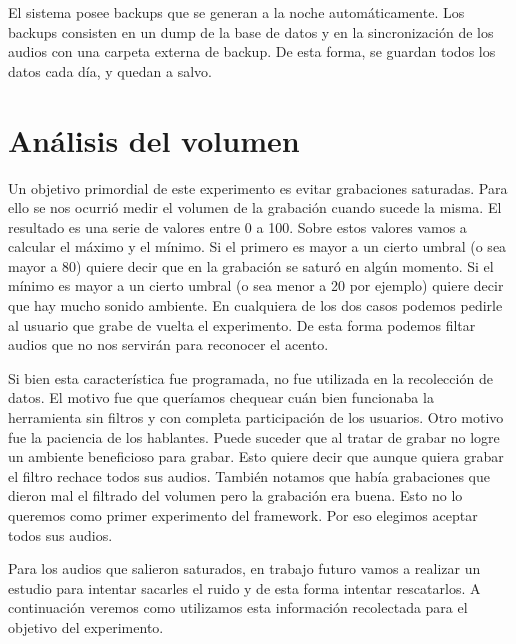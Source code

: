 El sistema posee backups que se generan a la noche automáticamente. Los backups consisten en un dump de la base de datos y en la sincronización de los audios con una carpeta externa de backup. De esta forma, se guardan todos los datos cada día, y quedan a salvo.

\section{Análisis del volumen}

Un objetivo primordial de este experimento es evitar grabaciones saturadas. Para ello se nos ocurrió medir el volumen de la grabación cuando sucede la misma. El resultado es una serie de valores entre 0 a 100. Sobre estos valores vamos a calcular el máximo y el mínimo. Si el primero es mayor a un cierto umbral (o sea mayor a 80) quiere decir que en la grabación se saturó en algún momento. Si el mínimo es mayor a un cierto umbral (o sea menor a 20 por ejemplo) quiere decir que hay mucho sonido ambiente. En cualquiera de los dos casos podemos pedirle al usuario que grabe de vuelta el experimento. De esta forma podemos filtar audios que no nos servirán para reconocer el acento.

Si bien esta característica fue programada, no fue utilizada en la recolección de datos. El motivo fue que queríamos chequear cuán bien funcionaba la herramienta sin filtros y con completa participación de los usuarios. Otro motivo fue la paciencia de los hablantes. Puede suceder que al tratar de grabar no logre un ambiente beneficioso para grabar. Esto quiere decir que aunque quiera grabar el filtro rechace todos sus audios. También notamos que había grabaciones que dieron mal el filtrado del volumen pero la grabación era buena. Esto no lo queremos como primer experimento del framework. Por eso elegimos aceptar todos sus audios.

Para los audios que salieron saturados, en trabajo futuro vamos a realizar un estudio para intentar sacarles el ruido y de esta forma intentar rescatarlos. A continuación veremos como utilizamos esta información recolectada para el objetivo del experimento.